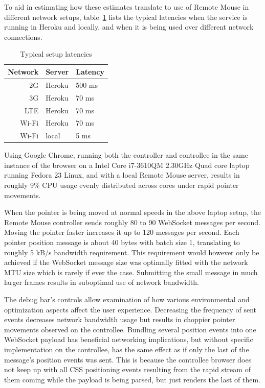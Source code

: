 \documentclass[a4paper,english,twocolumn]{article}
\begin{document}
To aid in estimating how these estimates translate to use of Remote
Mouse in different network setups, table~\ref{table:setuplatencies}
lists the typical latencies when the service is running in Heroku and
locally, and when it is being used over different network
connections.

\begin{table} \centering
  \begin{tabular}{rll}
    Network & Server & Latency \\
    \hline
    2G & Heroku    & 500 ms \\
    3G & Heroku    & 70 ms \\
    LTE & Heroku   & 70 ms \\
    Wi-Fi & Heroku & 70 ms \\
    Wi-Fi & local  & 5 ms \\
    \hline
  \end{tabular}
  \caption{Typical setup latencies}
  \label{table:setuplatencies}
\end{table}

Using Google Chrome, running both the controller and controllee in the
same instance of the browser on a Intel Core i7-3610QM 2.30GHz Quad
core laptop running Fedora 23 Linux, and with a local Remote Mouse
server, results in roughly 9\% CPU usage evenly distributed across
cores under rapid pointer movements.

When the pointer is being moved at normal speeds in the above laptop
setup, the Remote Mouse controller sends roughly 80 to 90 WebSocket
messages per second. Moving the pointer faster increases it up to 120
messages per second. Each pointer position message is about 40 bytes
with batch size 1, translating to roughly 5 kB/s bandwidth
requirement. This requirement would however only be achieved if the
WebSocket message size was optimally fitted with the network MTU size
which is rarely if ever the case. Submitting the small message in much
larger frames results in suboptimal use of network bandwidth.

The debug bar's controls allow examination of how various
environmental and optimization aspects affect the user
experience. Decreasing the frequency of sent events decreases network
bandwidth usage but results in choppier pointer movements observed on
the controllee. Bundling several position events into one WebSocket
payload has beneficial networking implications, but without specific
implementation on the controllee, has the same effect as if only the
last of the message's position events was sent. This is because the
controllee browser does not keep up with all CSS positioning events
resulting from the rapid stream of them coming while the payload is
being parsed, but just renders the last of them.
\end{document}
